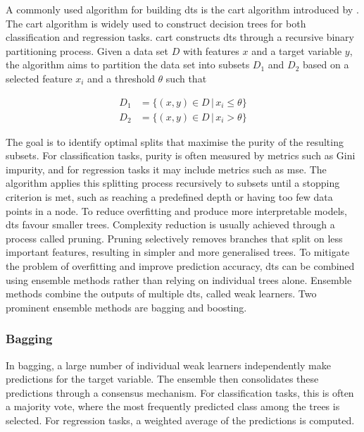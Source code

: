\noindent
A commonly used algorithm for building \glspl{dt} is the \gls{cart} algorithm introduced by \cite{breiman1984classification}. The \gls{cart} algorithm is widely used to construct decision trees for both classification and regression tasks.
\newline
\newline
\gls{cart} constructs \glspl{dt} through a recursive binary partitioning process. Given a data set $D$ with features $x$ and a target variable $y$, the algorithm aims to partition the data set into subsets $D_1$ and $D_2$ based on a selected feature $x_i$ and a threshold $\theta$ such that

\begin{align*}
    D_1 &= \{ (x, y) \in D \,|\, x_i \leq \theta \} \\
    D_2 &= \{ (x, y) \in D \,|\, x_i > \theta \}
\end{align*}

\noindent
The goal is to identify optimal splits that maximise the purity of the resulting subsets. For classification tasks, purity is often measured by metrics such as Gini impurity, and for regression tasks it may include metrics such as \gls{mse}. The algorithm applies this splitting process recursively to subsets until a stopping criterion is met, such as reaching a predefined depth or having too few data points in a node.
\newline
\newline
To reduce overfitting and produce more interpretable models, \glspl{dt} favour smaller trees. Complexity reduction is usually achieved through a process called pruning. Pruning selectively removes branches that split on less important features, resulting in simpler and more generalised trees.
\newline
\newline
To mitigate the problem of overfitting and improve prediction accuracy, \glspl{dt} can be combined using ensemble methods rather than relying on individual trees alone. Ensemble methods combine the outputs of multiple \glspl{dt}, called weak learners. Two prominent ensemble methods are bagging and boosting.

\subsubsection{Bagging}
\label{subsub:bagging}
In bagging, a large number of individual weak learners independently make predictions for the target variable. The ensemble then consolidates these predictions through a consensus mechanism. For classification tasks, this is often a majority vote, where the most frequently predicted class among the trees is selected. For regression tasks, a weighted average of the predictions is computed.

